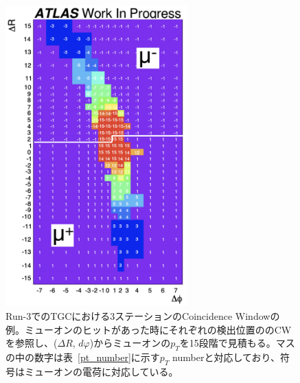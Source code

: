 
\begin{figure}[tb]
  \centering
  \includegraphics[clip, width=7cm]{fig/3/cw_run3_shiomi.png}
  \caption{Run-3でのTGCにおける3ステーションのCoincidence Windowの例\cite{article:shiomi-mron}。ミューオンのヒットがあった時にそれぞれの検出位置ののCWを参照し、($\Delta R$, $dφ$)からミューオンの$p_T$を15段階で見積もる。マスの中の数字は表~\ref{pt_number}に示す$p_T$ numberと対応しており、符号はミューオンの電荷に対応している。}
  \label{fig:CW}
\end{figure}

